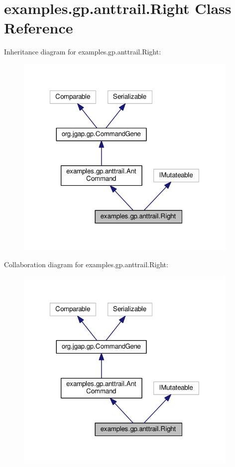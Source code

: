 \hypertarget{classexamples_1_1gp_1_1anttrail_1_1_right}{\section{examples.\-gp.\-anttrail.\-Right Class Reference}
\label{classexamples_1_1gp_1_1anttrail_1_1_right}
}


Inheritance diagram for examples.\-gp.\-anttrail.\-Right\-:
\nopagebreak
\begin{figure}[H]
\begin{center}
\leavevmode
\includegraphics[width=304pt]{classexamples_1_1gp_1_1anttrail_1_1_right__inherit__graph}
\end{center}
\end{figure}


Collaboration diagram for examples.\-gp.\-anttrail.\-Right\-:
\nopagebreak
\begin{figure}[H]
\begin{center}
\leavevmode
\includegraphics[width=304pt]{classexamples_1_1gp_1_1anttrail_1_1_right__coll__graph}
\end{center}
\end{figure}
